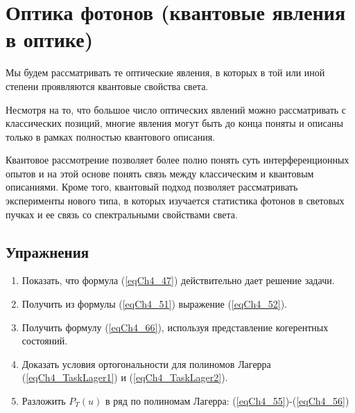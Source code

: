 \chapter{Оптика фотонов (квантовые явления в оптике)}
\label{chOptic}
Мы будем рассматривать те оптические явления, в которых в той или иной
степени проявляются квантовые свойства света. 

Несмотря на то, что большое число оптических явлений можно
рассматривать с классических позиций, многие явления могут быть до
конца поняты и описаны только в рамках полностью квантового описания. 

Квантовое рассмотрение позволяет более полно понять суть
интерференционных опытов и на этой основе понять связь между
классическим и квантовым описаниями. Кроме того, квантовый подход
позволяет рассматривать эксперименты нового типа, в которых изучается
статистика фотонов в световых пучках и ее связь со спектральными
свойствами света.  












\section{Упражнения}
\begin{enumerate}
\item Показать, что формула (\ref{eqCh4_47}) действительно дает
  решение задачи. 
\item Получить из формулы (\ref{eqCh4_51}) выражение (\ref{eqCh4_52}).
\item Получить формулу (\ref{eqCh4_66}), используя представление
  когерентных состояний.  
\item Доказать условия ортогональности для полиномов Лагерра
  (\ref{eqCh4_TaskLager1}) и (\ref{eqCh4_TaskLager2}).
\item Разложить $P_T\left(u\right)$ в ряд по полиномам Лагерра:
  (\ref{eqCh4_55})-(\ref{eqCh4_56})
\end{enumerate}


